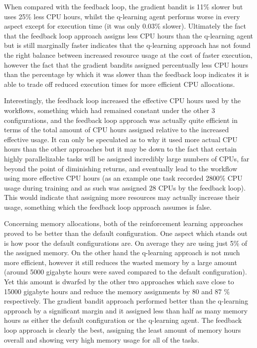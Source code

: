 When compared with the feedback loop, the gradient bandit is 11\% slower but uses 25\% less CPU hours, whilst the q-learning agent performs worse in every aspect except for execution time (it was only 0.03\% slower). Ultimately the fact that the feedback loop approach assigns less CPU hours than the q-learning agent but is still marginally faster indicates that the q-learning approach has not found the right balance between increased resource usage at the cost of faster execution, however the fact that the gradient bandits assigned percentually less CPU hours than the percentage by which it was slower than the feedback loop indicates it is able to trade off reduced execution times for more efficient CPU allocations.

Interestingly, the feedback loop increased the effective CPU hours used by the workflows, something which had remained constant under the other 3 configurations, and the feedback loop approach was actually quite efficient in terms of the total amount of CPU hours assigned relative to the increased effective usage. It can only be speculated as to why it used more actual CPU hours than the other approaches but it may be down to the fact that certain highly parallelizable tasks will be assigned incredibly large numbers of CPUs, far beyond the point of diminishing returns, and eventually lead to the workflow using more effective CPU hours (as an example one task recorded 2800\% CPU usage during training and as such was assigned 28 CPUs by the feedback loop). This would indicate that assigning more resources may actually increase their usage, something which the feedback loop approach assumes is false.

Concerning memory allocations, both of the reinforcement learning approaches proved to be better than the default configuration. One aspect which stands out is how poor the default configurations are. On average they are using just 5\% of the assigned memory. On the other hand the q-learning approach is not much more efficient, however it still reduces the wasted memory by a large amount (around 5000 gigabyte hours were saved compared to the default configuration). Yet this amount is dwarfed by the other two approaches which save close to 15000 gigabyte hours and reduce the memory assignments by 80 and 87 \% respectively. The gradient bandit approach performed better than the q-learning approach by a significant margin and it assigned less than half as many memory hours as either the default configuration or the q-learning agent. The feedback loop approach is clearly the best, assigning the least amount of memory hours overall and showing very high memory usage for all of the tasks.

